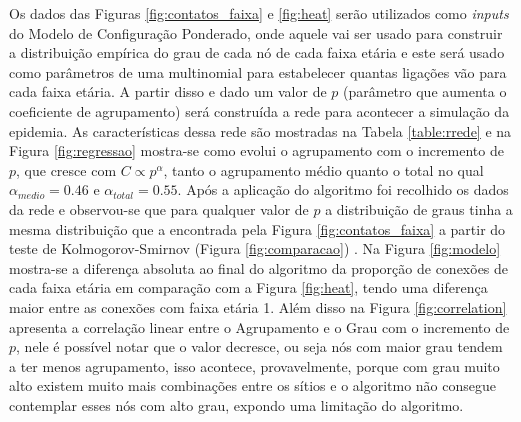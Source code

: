 Os dados das Figuras \ref{fig:contatos_faixa} e \ref{fig:heat} serão utilizados como \textit{inputs} do Modelo de Configuração Ponderado, onde aquele vai ser usado para construir a distribuição empírica do grau de cada nó de cada faixa etária e este será usado como parâmetros de uma multinomial para estabelecer quantas ligações vão para cada faixa etária. A partir disso e dado um valor de $p$ (parâmetro que aumenta o coeficiente de agrupamento) será construída a rede para acontecer a simulação da epidemia. As características dessa rede são mostradas na Tabela \ref{table:rrede} e na Figura \ref{fig:regressao}
mostra-se como evolui o agrupamento com o incremento de $p$, que cresce com $C \propto p^{\alpha}$, tanto o agrupamento médio quanto o total no qual $\alpha_{medio } = 0.46$ e $\alpha_{total } = 0.55$. Após a aplicação do algoritmo foi recolhido os dados da rede e observou-se que para qualquer valor de $p$ a distribuição de graus tinha a mesma distribuição que a encontrada pela Figura \ref{fig:contatos_faixa} a partir do teste de Kolmogorov-Smirnov (Figura \ref{fig:comparacao}) \cite{manual}. Na Figura \ref{fig:modelo}
mostra-se a diferença absoluta ao final do algoritmo da proporção de conexões de cada faixa etária em comparação com a Figura \ref{fig:heat}, tendo uma diferença maior entre as conexões com faixa etária 1. Além disso na Figura \ref{fig:correlation} apresenta a correlação linear entre o Agrupamento e o Grau com o incremento de $p$, nele é possível notar que o valor decresce, ou seja nós com maior grau tendem a ter menos agrupamento, isso acontece, provavelmente, porque com grau muito alto existem muito mais combinações entre os sítios e o algoritmo não consegue contemplar esses nós com alto grau, expondo uma limitação do algoritmo.
